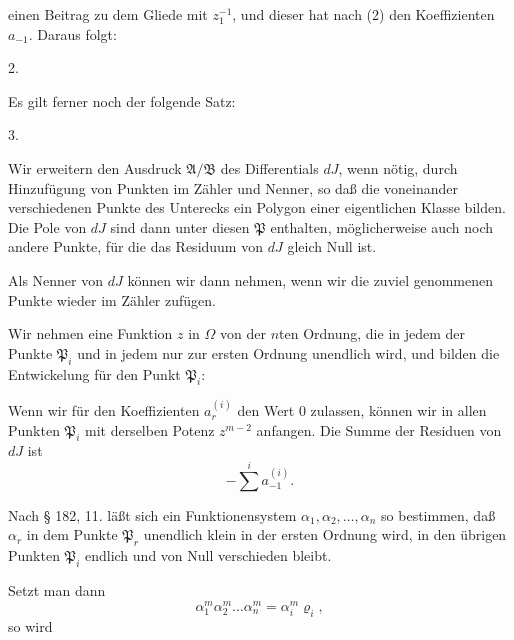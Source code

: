 einen Beitrag zu dem Gliede mit $z_1^{-1}$, und dieser hat nach (2) den Koeffizienten $a_{-1}$. Daraus folgt:

2. 

Es gilt ferner noch der folgende Satz:

3. 

Wir erweitern den Ausdruck $\mathfrak{A}/\mathfrak{B}$ des Differentials $dJ$, wenn nötig, durch Hinzufügung von Punkten im Zähler und Nenner, so daß die voneinander verschiedenen Punkte des Unterecks
ein Polygon einer eigentlichen Klasse bilden. Die Pole von $dJ$ sind dann unter diesen $\mathfrak{P}$ enthalten, möglicherweise auch noch andere Punkte, für die das Residuum von $dJ$ gleich Null ist.

Als Nenner von $dJ$ können wir dann
nehmen, wenn wir die zuviel genommenen Punkte wieder im Zähler zufügen.

Wir nehmen eine Funktion $z$ in $\Omega$ von der $n$ten Ordnung, die in jedem der Punkte $\mathfrak{P}_i$ und in jedem nur zur ersten Ordnung unendlich wird, und bilden die Entwickelung für den Punkt $\mathfrak{P}_i$:

Wenn wir für den Koeffizienten $a_r^{(i)}$ den Wert 0 zulassen, können wir in allen Punkten $\mathfrak{P}_i$ mit derselben Potenz $z^{m-2}$ anfangen. Die Summe der Residuen von $dJ$ ist
\[
-\overset{i}{\sum} a_{-1}^{(i)}.
\]

Nach § 182, 11. läßt sich ein Funktionensystem $\alpha_1, \alpha_2, \ldots, \alpha_n$ so bestimmen, daß $\alpha_r$ in dem Punkte $\mathfrak{P}_r$ unendlich klein in der ersten Ordnung wird, in den übrigen Punkten $\mathfrak{P}_i$ endlich und von Null verschieden bleibt.

Setzt man dann
\[
\alpha_1^m \alpha_2^m \ldots \alpha_n^m = \alpha_i^m \varrho_i,
\]
so wird
